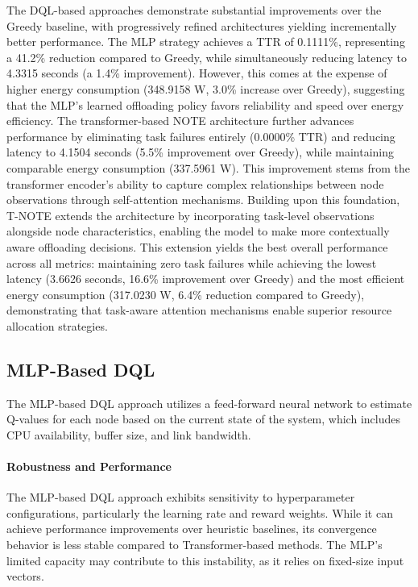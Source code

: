 \documentclass[preprint,3p,authoryear]{elsarticle}
\begin{document}
The DQL-based approaches demonstrate substantial improvements over the Greedy baseline, with progressively refined architectures yielding incrementally better performance. The MLP strategy achieves a TTR of 0.1111\%, representing a 41.2\% reduction compared to Greedy, while simultaneously reducing latency to 4.3315 seconds (a 1.4\% improvement). However, this comes at the expense of higher energy consumption (348.9158 W, 3.0\% increase over Greedy), suggesting that the MLP's learned offloading policy favors reliability and speed over energy efficiency. The transformer-based NOTE architecture further advances performance by eliminating task failures entirely (0.0000\% TTR) and reducing latency to 4.1504 seconds (5.5\% improvement over Greedy), while maintaining comparable energy consumption (337.5961 W). This improvement stems from the transformer encoder's ability to capture complex relationships between node observations through self-attention mechanisms. Building upon this foundation, T-NOTE extends the architecture by incorporating task-level observations alongside node characteristics, enabling the model to make more contextually aware offloading decisions. This extension yields the best overall performance across all metrics: maintaining zero task failures while achieving the lowest latency (3.6626 seconds, 16.6\% improvement over Greedy) and the most efficient energy consumption (317.0230 W, 6.4\% reduction compared to Greedy), demonstrating that task-aware attention mechanisms enable superior resource allocation strategies.


\subsection{MLP-Based DQL}\label{subsec:mlp_perf}

The MLP-based DQL approach utilizes a feed-forward neural network to estimate Q-values for each node based on the current state of the system, which includes CPU availability, buffer size, and link bandwidth. 

\paragraph{Robustness and Performance}

The MLP-based DQL approach exhibits sensitivity to hyperparameter configurations, particularly the learning rate and reward weights. While it can achieve performance improvements over heuristic baselines, its convergence behavior is less stable compared to Transformer-based methods. The MLP's limited capacity may contribute to this instability, as it relies on fixed-size input vectors.
\end{document}

